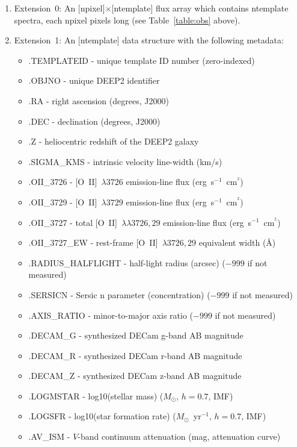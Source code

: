 \documentclass[12pt]{article}
\newcommand{\oii}{[O~II]}
\newcommand{\oiilam}{[O~II]~\ensuremath{\lambda\lambda3726,29}}
\begin{document}
\begin{enumerate}
\item{Extension~0: An [{\sc npixel}]$\times$[{\sc ntemplate}] flux
  array which contains {\sc ntemplate} spectra, each {\sc npixel}
  pixels long (see Table~\ref{table:obs} above).}
\item{Extension~1: An [{\sc ntemplate}] data structure with the
  following metadata:
\begin{itemize}
\item{.{\sc TEMPLATEID} - unique template ID number (zero-indexed)}
\item{.{\sc OBJNO} - unique DEEP2 identifier}
\item{.{\sc RA} - right ascension (degrees, J2000)}
\item{.{\sc DEC} - declination (degrees, J2000)}
\item{.{\sc Z} - heliocentric redshift of the DEEP2 galaxy} 
\item{.{\sc SIGMA\_KMS} - intrinsic velocity line-width (km/s)} 
\item{.{\sc OII\_3726} - \oii~$\lambda3726$ emission-line flux
  (erg~s$^{-1}$~cm$^{^2}$)}  
\item{.{\sc OII\_3729} - \oii~$\lambda3729$ emission-line flux
  (erg~s$^{-1}$~cm$^{^2}$)} 
\item{.{\sc OII\_3727} - total \oiilam{} emission-line flux
  (erg~s$^{-1}$~cm$^{^2}$)} 
\item{.{\sc OII\_3727\_EW} - rest-frame \oii~$\lambda3726,29$
  equivalent width (\AA)}
\item{.{\sc RADIUS\_HALFLIGHT} - half-light radius (arcsec) ($-999$ if not measured)}
\item{.{\sc SERSICN} - Sersic n parameter (concentration) ($-999$ if not measured)}
\item{.{\sc AXIS\_RATIO} - minor-to-major axis ratio ($-999$ if not measured)}
\item{.{\sc DECAM\_G} - synthesized DECam g-band AB magnitude}
\item{.{\sc DECAM\_R} - synthesized DECam r-band AB magnitude}
\item{.{\sc DECAM\_Z} - synthesized DECam z-band AB magnitude}
\item{.{\sc LOGMSTAR} - log10(stellar mass) ($M_{\odot}$, $h=0.7$,
  \citealt{chabrier03a} IMF)} 
\item{.{\sc LOGSFR} - log10(star formation rate)
  ($M_{\odot}$~yr$^{-1}$, $h=0.7$, \citealt{chabrier03a} IMF)}
\item{.{\sc AV\_ISM} - $V$-band continuum attenuation (mag,
  \citealt{charlot00a} attenuation curve)} 
\end{itemize}
}
\end{enumerate}
\end{document}
